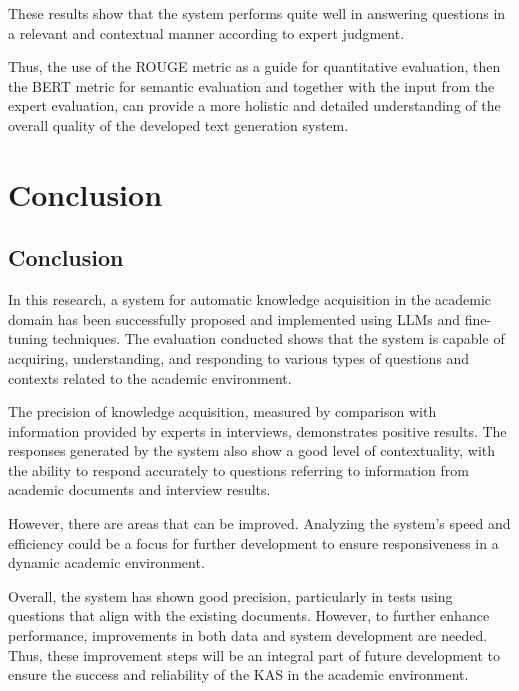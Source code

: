 \documentclass[runningheads]{llncs}
\begin{document}
These results show that the system performs quite well in answering questions in a relevant and contextual manner according to expert judgment.

Thus, the use of the ROUGE metric as a guide for quantitative evaluation, then the BERT metric for semantic evaluation and together with the input from the expert evaluation, can provide a more holistic and detailed understanding of the overall quality of the developed text generation system.

\section{Conclusion}
\subsection{Conclusion}
In this research, a system for automatic knowledge acquisition in the academic domain has been successfully proposed and implemented using LLMs and fine-tuning techniques. The evaluation conducted shows that the system is capable of acquiring, understanding, and responding to various types of questions and contexts related to the academic environment.

The precision of knowledge acquisition, measured by comparison with information provided by experts in interviews, demonstrates positive results. The responses generated by the system also show a good level of contextuality, with the ability to respond accurately to questions referring to information from academic documents and interview results.

However, there are areas that can be improved. Analyzing the system's speed and efficiency could be a focus for further development to ensure responsiveness in a dynamic academic environment.

Overall, the system has shown good precision, particularly in tests using questions that align with the existing documents. However, to further enhance performance, improvements in both data and system development are needed. Thus, these improvement steps will be an integral part of future development to ensure the success and reliability of the KAS in the academic environment.


%
%
%


%
\end{document}
